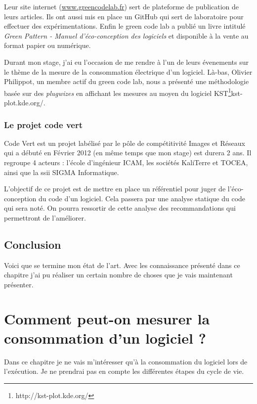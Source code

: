 \documentclass[a4paper, 11pt]{report}
\begin{document}
Leur site internet (\href{http://www.greencodelab.fr}{www.greencodelab.fr}) sert de plateforme de publication de leurs articles. Ils ont aussi mis en place un GitHub qui sert de laboratoire pour effectuer des expérimentations. Enfin le green code lab a publié un livre intitulé \textit{Green Pattern - Manuel d'éco-conception des logiciels} et disponible à la vente au format papier ou numérique.

Durant mon stage, j'ai eu l'occasion de me rendre à l'un de leurs évenements sur le thème de la mesure de la consommation électrique d'un logiciel. Là-bas, Olivier Philippot, un membre actif du green code lab, nous a présenté une méthodologie basée sur des \textit{plugwizes} en affichant les mesures au moyen du logiciel KST\footnote{http://kst-plot.kde.org/}{kst-plot.kde.org/}.
		\subsection{Le projet code vert}
Code Vert est un projet labélisé par le pôle de compétitivité Images et Réseaux qui a débuté en Février 2012 (en même temps que mon stage) est durera 2 ans. Il regroupe 4 acteurs : l'école d'ingénieur ICAM, les sociétés KaliTerre et TOCEA, ainsi que la ssii SIGMA Informatique.

L'objectif de ce projet est de mettre en place un référentiel pour juger de l'éco-conception du code d'un logiciel. Cela passera par une analyse statique du code qui sera noté. On pourra ressortir de cette analyse des recommandations qui permettront de l'améliorer.
		
	\section{Conclusion}
Voici que se termine mon état de l'art. Avec les connaissance présenté dans ce chapitre j'ai pu réaliser un certain nombre de choses que je vais maintenant présenter.

\chapter{Comment peut-on mesurer la consommation d'un logiciel ?}
Dans ce chapitre je ne vais m'intéresser qu'à la consommation du logiciel lors de l'exécution. Je ne prendrai pas en compte les différentes étapes du cycle de vie.
\end{document}
